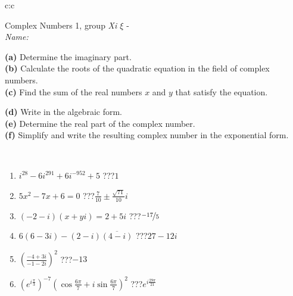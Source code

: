 \documentclass[10pt]{report}
\begin{document}
\begin{tabular}{c:c}
\begin{minipage}[c][104.5mm][t]{0.5\linewidth}
\begin{center}
\vspace{5mm}
{\huge Complex Numbers 1, group \textit{Xi $\xi$} -}\\[5mm]
\textit{Name:}\phantom{xxxxxxxxxxxxxxxxxxxxxxxxxxxxxxxxxxxxxxxxxxxxxxxxxxxxxxxxxxxxxxxxx}\\[5mm]
\begin{minipage}{0.95\linewidth}
\begin{center}
{\small \begin{minipage}{0.44\textwidth} \raggedright
\textbf{(a)} Determine the imaginary part. \\[1mm]
\textbf{(b)} Calculate the roots of the quadratic equation in the field of complex numbers. \\[1mm]
\textbf{(c)} Find the sum of the real numbers \(x\) and \(y\) that satisfy the equation. \end{minipage} \begin{minipage}{0.54\textwidth}
\textbf{(d)} Write in the algebraic form. \\[1mm]
\textbf{(e)} Determine the real part of the complex number. \\[1mm]
\textbf{(f)} Simplify and write the resulting complex number in the exponential form.
\end{minipage}
} \vspace{3mm}
\end{center}
\end{minipage}
\\[1mm]
\begin{minipage}{0.79\linewidth}
\begin{center}
\begin{varwidth}{\linewidth}
\setlength{\itemsep}{0pt}
\begin{enumerate}
\large
\item $i^{28}-6i^{291}+6i^{-952}+5$\quad \dotfill\; ???\;\dotfill \quad $1$
\item $5x^2-7x+6=0$\quad \dotfill\; ???\;\dotfill \quad $\frac{7}{10} \pm{}\frac{ \sqrt{71}}{10}i$
\item $(-2-i)(x+yi)=2+5i$\quad \dotfill\; ???\;\dotfill \quad $\nicefrac{-17}{5}$
\item $6(6-3i)-(2-i)\overline{(4-i)}$\quad \dotfill\; ???\;\dotfill \quad $27-12i$
\item $\left(\frac{-4+3i}{-1-2i}\right)^2$\quad \dotfill\; ???\;\dotfill \quad $-13$
\item $\left(e^{i\frac{\pi}{3}}\right)^{-7}\left(\cos{\frac{6\pi}{7}}+i\sin{\frac{6\pi}{7}}\right)^{2}$\quad \dotfill\; ???\;\dotfill \quad $e^{i\frac{29\pi}{21}}$

\end{enumerate}
\end{varwidth}
\end{center}
\end{minipage}
\end{center}
\end{minipage}
\end{tabular}
\end{document}
